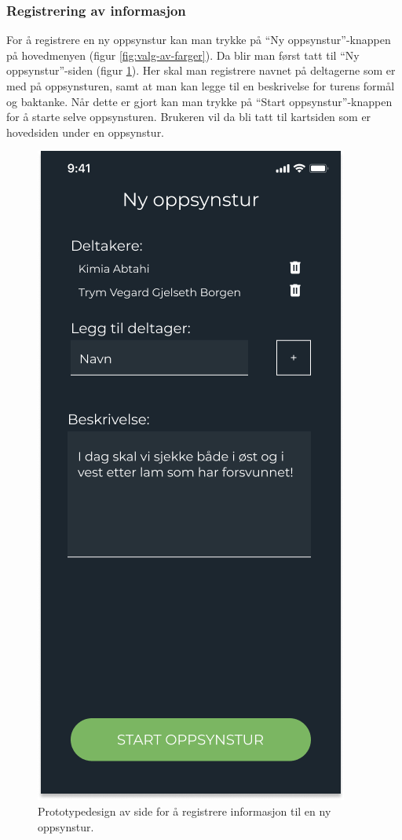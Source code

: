 \subsubsection{Registrering av informasjon}
For å registrere en ny oppsynstur kan man trykke på \enquote{Ny oppsynstur}-knappen på hovedmenyen (figur \ref{fig:valg-av-farger}). Da blir man først tatt til \enquote{Ny oppsynstur}-siden (figur \ref{fig:figma-info-ny-oppsynstur}). Her skal man registrere navnet på deltagerne som er med på oppsynsturen, samt at man kan legge til en beskrivelse for turens formål og baktanke. Når dette er gjort kan man trykke på \enquote{Start oppsynstur}-knappen for å starte selve oppsynsturen. Brukeren vil da bli tatt til kartsiden som er hovedsiden under en oppsynstur.
\begin{figure}[H]
\centering
\captionsetup{width=.8\linewidth}
\includegraphics[scale=0.4]{Figurer/Figma/Frame 2 - Ny oppsynstur.png}
\caption{Prototypedesign av side for å registrere informasjon til en ny oppsynstur.}
\label{fig:figma-info-ny-oppsynstur}
\end{figure}

